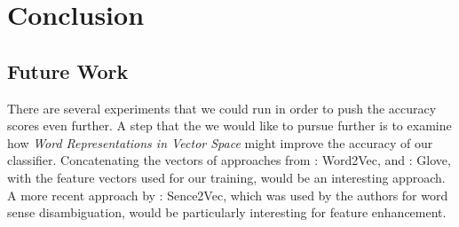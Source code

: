\chapter{Conclusion}
\label{chap:conclusion}


\section{Future Work}
\label{future_work}


There are several experiments that we could run in order to push the accuracy scores even further. A step that the we would like to pursue further is to examine how \textit{Word Representations in Vector Space} might improve the accuracy of our classifier. Concatenating the vectors of approaches from : Word2Vec, and : Glove, with the feature vectors used for our training, would be an interesting approach. A more recent approach by : Sence2Vec, which was used by the authors for word sense disambiguation, would be particularly interesting for feature enhancement.